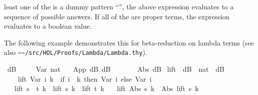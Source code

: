 \begin{isabellebody}
\begin{isamarkuptext}
  least one of the  is a dummy pattern ``'',
  the above expression evaluates to a sequence of possible answers. If
  all of the  are proper terms, the expression evaluates
  to a boolean value.

  The following example demonstrates this for beta-reduction on lambda
  terms (see also \verb|~~/src/HOL/Proofs/Lambda/Lambda.thy|).%
\end{isamarkuptext}%
\isamarkuptrue%
\isamarkupfalse%
\ dB\ {}\isanewline
\ \ \ \ Var\ nat\isanewline
\ \ {}\ App\ dB\ dB\ \ {}\ {}{}{}\ {}{}{}{}\isanewline
\ \ {}\ Abs\ dB\isanewline
\isanewline
{}\isamarkupfalse%
\ lift\ {}{}\ {}dB\ {}\ nat\ {}\ dB{}\isanewline
{}\isanewline
\ \ \ \ {}lift\ {}Var\ i{}\ k\ {}\ {}if\ i\ {}\ k\ then\ Var\ i\ else\ Var\ {}i\ {}\ {}{}{}{}\isanewline
\ \ {}\ {}lift\ {}s\ {}\ t{}\ k\ {}\ lift\ s\ k\ {}\ lift\ t\ k{}\isanewline
\ \ {}\ {}lift\ {}Abs\ s{}\ k\ {}\ Abs\ {}lift\ s\ {}k\ {}\ {}{}{}{}\isanewline

\end{isabellebody}

